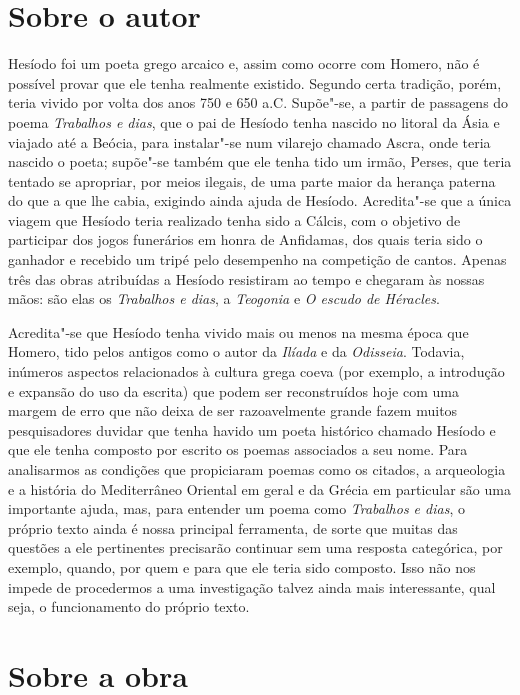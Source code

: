 
\section{Sobre o autor}

Hesíodo foi um poeta grego arcaico e, assim como ocorre com Homero,
não é possível provar que ele tenha realmente existido. Segundo certa tradição,
porém, teria vivido por volta dos anos 750 e 650 a.C.  Supõe"-se, a partir de
passagens do poema \textit{Trabalhos e dias}, que o pai de Hesíodo tenha
nascido no litoral da Ásia e viajado até a Beócia, para instalar"-se num
vilarejo chamado Ascra, onde teria nascido o poeta; supõe"-se também que ele
tenha tido um irmão, Perses, que teria tentado se apropriar, por meios ilegais,
de uma parte maior da herança paterna do que a que lhe cabia, exigindo ainda
ajuda de Hesíodo. Acredita"-se que a única viagem que Hesíodo teria realizado
tenha sido a Cálcis, com o objetivo de participar dos jogos funerários em honra
de Anfidamas, dos quais teria sido o ganhador e recebido um tripé pelo
desempenho na competição de cantos. Apenas três das obras atribuídas a Hesíodo
resistiram ao tempo e chegaram às nossas mãos: são elas os \textit{Trabalhos e
dias}, a \textit{Teogonia} e \textit{O escudo de Héracles}.

Acredita"-se que Hesíodo tenha vivido mais ou menos na mesma época que Homero,
tido pelos antigos como o autor da \emph{Ilíada} e da
\emph{Odisseia}. Todavia, inúmeros aspectos relacionados à cultura grega
coeva (por exemplo, a introdução e expansão do uso da escrita) que podem
ser reconstruídos hoje com uma margem de erro que não deixa de ser
razoavelmente grande fazem muitos pesquisadores duvidar que tenha havido
um poeta histórico chamado Hesíodo e que ele tenha composto por escrito
os poemas associados a seu nome. Para analisarmos as condições que
propiciaram poemas como os citados, a arqueologia e a história do
Mediterrâneo Oriental em geral e da Grécia em particular são uma
importante ajuda, mas, para entender um poema como \emph{Trabalhos e
dias}, o próprio texto ainda é nossa principal ferramenta, de sorte que
muitas das questões a ele pertinentes precisarão continuar sem uma
resposta categórica, por exemplo, quando, por quem e para que ele teria
sido composto. Isso não nos impede de procedermos a uma investigação
talvez ainda mais interessante, qual seja, o funcionamento do próprio
texto.


\section{Sobre a obra}

